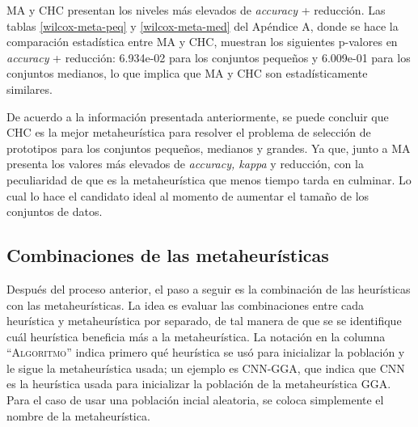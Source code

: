 %
%


MA y CHC presentan los niveles más elevados de \emph{accuracy} + reducción. Las tablas \ref{wilcox-meta-peq} y \ref{wilcox-meta-med} del Apéndice A, donde se hace la comparación estadística entre MA y CHC, muestran los siguientes p-valores en \emph{accuracy} + reducción: 6.934e-02 para los conjuntos pequeños y 6.009e-01 para los conjuntos medianos, lo que implica que MA y CHC son estadísticamente similares. 
 
De acuerdo a la información presentada anteriormente, se puede concluir que CHC es la mejor metaheurística para resolver el problema de selección de prototipos para los conjuntos pequeños, medianos y grandes. Ya que, junto a MA presenta los valores más elevados de \emph{accuracy, kappa} y reducción, con la peculiaridad de que es la metaheurística que menos tiempo tarda en culminar. Lo cual lo hace el candidato ideal al momento de aumentar el tamaño de los conjuntos de datos.  

\subsection{Combinaciones de las metaheurísticas}

Después del proceso anterior, el paso a seguir es la combinación de las heurísticas con las metaheurísticas. La idea es evaluar las combinaciones entre cada heurística y metaheurística por separado, de tal manera de que se se identifique cuál heurística beneficia más a la metaheurística. La notación en la columna ``\textsc{Algoritmo}'' indica primero qué heurística se usó para inicializar la población y le sigue la metaheurística usada; un ejemplo es CNN-GGA, que indica que CNN es la heurística usada para inicializar la población de la metaheurística GGA. Para el caso de usar una población incial aleatoria, se coloca simplemente el nombre de la metaheurística.


